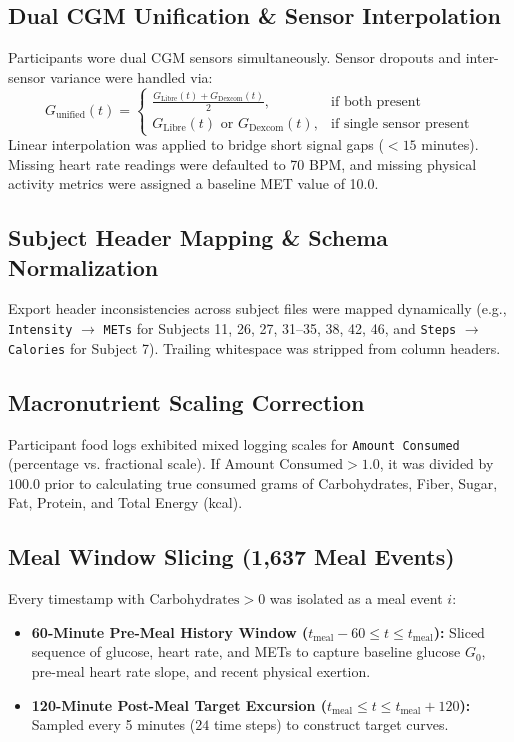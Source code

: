 \documentclass[11pt,a4paper]{article}
\begin{document}
\subsection{Dual CGM Unification \& Sensor Interpolation}
Participants wore dual CGM sensors simultaneously. Sensor dropouts and inter-sensor variance were handled via:
\begin{equation}
    G_{\text{unified}}(t) = \begin{cases}
        \frac{G_{\text{Libre}}(t) + G_{\text{Dexcom}}(t)}{2}, & \text{if both present} \\
        G_{\text{Libre}}(t) \text{ or } G_{\text{Dexcom}}(t), & \text{if single sensor present}
    \end{cases}
\end{equation}
Linear interpolation was applied to bridge short signal gaps ($<15$ minutes). Missing heart rate readings were defaulted to 70 BPM, and missing physical activity metrics were assigned a baseline MET value of 10.0.

\subsection{Subject Header Mapping \& Schema Normalization}
Export header inconsistencies across subject files were mapped dynamically (e.g., \texttt{Intensity} $\rightarrow$ \texttt{METs} for Subjects 11, 26, 27, 31--35, 38, 42, 46, and \texttt{Steps} $\rightarrow$ \texttt{Calories} for Subject 7). Trailing whitespace was stripped from column headers.

\subsection{Macronutrient Scaling Correction}
Participant food logs exhibited mixed logging scales for \texttt{Amount Consumed} (percentage vs. fractional scale). If $\text{Amount Consumed} > 1.0$, it was divided by $100.0$ prior to calculating true consumed grams of Carbohydrates, Fiber, Sugar, Fat, Protein, and Total Energy (kcal).

\subsection{Meal Window Slicing (1,637 Meal Events)}
Every timestamp with $\text{Carbohydrates} > 0$ was isolated as a meal event $i$:
\begin{itemize}
    \item \textbf{60-Minute Pre-Meal History Window ($t_{\text{meal}} - 60 \le t \le t_{\text{meal}}$):} Sliced sequence of glucose, heart rate, and METs to capture baseline glucose $G_0$, pre-meal heart rate slope, and recent physical exertion.
    \item \textbf{120-Minute Post-Meal Target Excursion ($t_{\text{meal}} \le t \le t_{\text{meal}} + 120$):} Sampled every 5 minutes ($24$ time steps) to construct target curves.
\end{itemize}
\end{document}
